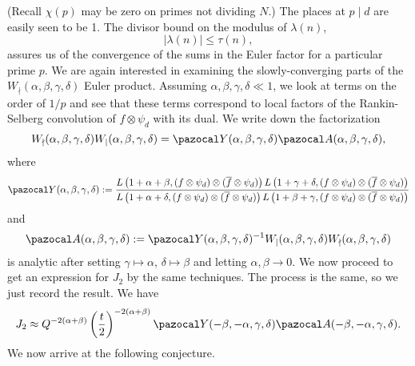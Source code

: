 \documentclass[11pt,reqno]{amsart} \usepackage{fullpage}
\renewcommand{\leq}{\leqslant}
\newcommand{\ra}{\rightarrow}
\newcommand\be{\begin{equation}}
\newcommand\ee{\end{equation}}
\numberwithin{equation}{section}
\begin{document}
(Recall $\chi(p)$ may be zero on primes not dividing $N$.)
The places at $p\mid d$ are easily seen to be 1.
The divisor bound on the modulus of $\lambda(n)$,
\be|\lambda(n)|\leq\tau(n),\ee assures us
of the convergence of the sums in the Euler factor for a particular prime $p$.
We are again interested in examining the
slowly-converging parts of the $W_\nmid(\alpha,\beta,\gamma,\delta)$ Euler product.
Assuming $\alpha,\beta,\gamma,\delta\ll1$, we look at terms on the order of $1/p$ and see
that these terms correspond to local factors of the Rankin-Selberg convolution
of $f\otimes\psi_d$ with its dual. We write down the factorization
\be W_\nmid(\alpha,\beta,\gamma,\delta)W_\mid(\alpha,\beta,\gamma,\delta)
=\pazocal Y(\alpha,\beta,\gamma,\delta)\pazocal A(\alpha,\beta,\gamma,\delta),\ee where
\be\pazocal Y(\alpha,\beta,\gamma,\delta):=
\frac{L\left(1+\alpha+\beta,(f\otimes\psi_d)\otimes(\overline f\otimes\psi_d)\right)
  L\left(1+\gamma+\delta,(f\otimes\psi_d)\otimes(\overline f\otimes\psi_d)\right)}
{L\left(1+\alpha+\delta,(f\otimes\psi_d)\otimes(\overline f\otimes\psi_d)\right)
  L\left(1+\beta+\gamma,(f\otimes\psi_d)\otimes(\overline f\otimes\psi_d)\right)}\ee and
\be\label{eq:defpazoA} \pazocal A(\alpha,\beta,\gamma,\delta):=
\pazocal Y(\alpha,\beta,\gamma,\delta)^{-1}
W_\mid(\alpha,\beta,\gamma,\delta)W_\nmid(\alpha,\beta,\gamma,\delta)\ee
is analytic after setting $\gamma\mapsto\alpha$, $\delta\mapsto\beta$ and letting
$\alpha,\beta\ra0$.
We now proceed to get an expression for $J_2$ by the same techniques. The process is the
same, so we just record the result. We have
\be J_2\approx Q^{-2(\alpha+\beta)}\left(\frac t2\right)^{-2(\alpha+\beta)}
\pazocal Y(-\beta,-\alpha,\gamma,\delta)\pazocal A(-\beta,-\alpha,\gamma,\delta).\ee
We now arrive at the following conjecture.
\end{document}
